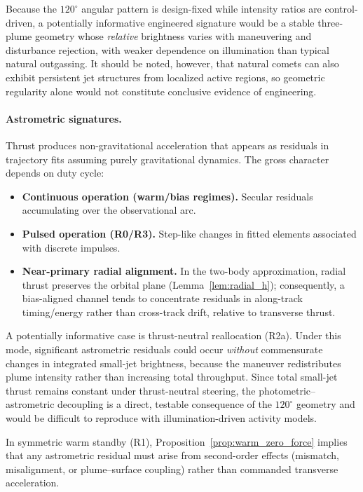 \documentclass{article}
\begin{document}
Because the $120^\circ$ angular pattern is design-fixed while intensity ratios are control-driven, a potentially informative engineered signature would be a stable three-plume geometry whose \emph{relative} brightness varies with maneuvering and disturbance rejection, with weaker dependence on illumination than typical natural outgassing. It should be noted, however, that natural comets can also exhibit persistent jet structures from localized active regions, so geometric regularity alone would not constitute conclusive evidence of engineering.


\paragraph{Astrometric signatures.}

Thrust produces non-gravitational acceleration that appears as residuals in trajectory fits assuming purely gravitational dynamics. The gross character depends on duty cycle:

\begin{itemize}
    \item \textbf{Continuous operation (warm/bias regimes).} Secular residuals accumulating over the observational arc.
    \item \textbf{Pulsed operation (R0/R3).} Step-like changes in fitted elements associated with discrete impulses.
    \item \textbf{Near-primary radial alignment.} In the two-body approximation, radial thrust preserves the orbital plane (Lemma~\ref{lem:radial_h}); consequently, a bias-aligned channel tends to concentrate residuals in along-track timing/energy rather than cross-track drift, relative to transverse thrust.
\end{itemize}

A potentially informative case is thrust-neutral reallocation (R2a). Under this mode, significant astrometric residuals could occur \emph{without} commensurate changes in integrated small-jet brightness, because the maneuver redistributes plume intensity rather than increasing total throughput. Since total small-jet thrust remains constant under thrust-neutral steering, the photometric--astrometric decoupling is a direct, testable consequence of the $120^\circ$ geometry and would be difficult to reproduce with illumination-driven activity models.

In symmetric warm standby (R1), Proposition~\ref{prop:warm_zero_force} implies that any astrometric residual must arise from second-order effects (mismatch, misalignment, or plume--surface coupling) rather than commanded transverse acceleration.
\end{document}
